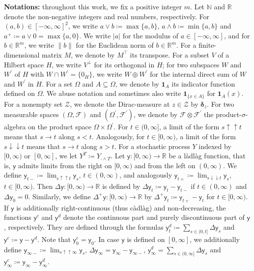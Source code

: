 \documentclass[10pt]{article} %
\newcommand\cF{\mathcal F}
\newcommand\cZ{\mathcal Z}
\def \N{\mathbb{N}}
\def \R{\mathbb{R}}
\newcommand{\1}{\mathbf{1}}
\begin{document}
\medskip
{\small\textbf{Notations:} {throughout this work, we fix a positive integer $m$. Let $\N$ and $\R$ denote the non-negative integers and real numbers, respectively. For $(a,b) \in [-\infty,\infty]^2$, we write $a \lor b \coloneqq \max\{a,b\}$, $a \land b \coloneqq \min\{a,b\}$ and $a^+ \coloneqq a \lor 0 = \max\{a,0\}$. We write $|a|$ for the modulus of $a \in [-\infty,\infty]$, and for $b \in \R^m$, we write $\|b\|$ for the Euclidean norm of $b \in \R^m$. For a finite-dimensional matrix $M$, we denote by $M^\top$ its transpose. For a subset $V$ of a Hilbert space $H$, we write $V^\perp$ for its orthogonal in $H$; for two subspaces $W$ and $W^\prime$ of $H$ with $W \cap W^\prime = \{0_H\}$, we write $W \oplus W^\prime$ for the internal direct sum of $W$ and $W^\prime$ in $H$.  For a set $\Omega$ and $A \subseteq \Omega$, we denote by $\mathbf{1}_A$ its indicator function defined on $\Omega$. We abuse notation and sometimes also write $\mathbf{1}_{\{x \in A\}}$ for $\mathbf{1}_{A}(x)$. For a nonempty set $\cZ$, we denote the Dirac-measure at $z \in \cZ$ by $\boldsymbol{\delta}_z$. For two measurable spaces $(\Omega,\cF)$ and $(\Omega^\prime,\cF^\prime)$, we denote by $\cF \otimes \cF^\prime$ the product-$\sigma$-algebra on the product space $\Omega \times \Omega^\prime$. For $t \in (0,\infty]$, a limit of the form $s \uparrow\uparrow t$ means that $s \rightarrow t$ along $s < t$. Analogously, for $t \in [0,\infty)$, a limit of the form $s \downarrow\downarrow t$ means that $s \rightarrow t$ along $s > t$. For a stochastic process $Y$ indexed by $[0,\infty)$ or $[0,\infty]$, we let $Y^T \coloneqq Y_{\cdot \land T}$.  Let $\mathsf{y} : [0,\infty) \rightarrow \R$ be a l\`adl\`ag function, that is, $\mathsf{y}$ admits limits from the right on $[0,\infty)$ and from the left on $(0,\infty)$. We define $\mathsf{y}_{t-} \coloneqq \lim_{s \uparrow\uparrow t} \mathsf{y}_s$, $t \in (0,\infty)$, and analogously $\mathsf{y}_{t+} \coloneqq \lim_{s \downarrow\downarrow t} \mathsf{y}_s$, $t \in [0,\infty)$. Then $\Delta \mathsf{y} : [0,\infty) \rightarrow \R$ is defined by $\Delta \mathsf{y}_t \coloneqq \mathsf{y}_t - \mathsf{y}_{t-}$ if $t \in (0,\infty)$ and $\Delta\mathsf{y}_0 = 0$. Similarly, we define $\Delta^+ \mathsf{y} : [0,\infty) \rightarrow \R$ by $\Delta^+ \mathsf{y}_t \coloneqq \mathsf{y}_{t+} - \mathsf{y}_t$ for $t \in [0,\infty)$. If $\mathsf{y}$ is additionally right-continuous (thus c\`adl\`ag) and non-decreasing, the functions $\mathsf{y}^c$ and $\mathsf{y}^d$ denote the continuous part and purely discontinuous part of $\mathsf{y}$, respectively. They are defined through the formulas $\mathsf{y}^d_t \coloneqq \sum_{s \in (0,t]} \Delta\mathsf{y}_s$ and $\mathsf{y}^c \coloneqq \mathsf{y} - \mathsf{y}^d$. Note that $\mathsf{y}^c_0 = \mathsf{y}_0$. In case $\mathsf{y}$ is defined on $[0,\infty]$, we additionally define $\mathsf{y}_{\infty-} \coloneqq \lim_{s \uparrow\uparrow \infty}\mathsf{y}_s$, $\Delta \mathsf{y}_\infty = \mathsf{y}_\infty - \mathsf{y}_{\infty-}$, $\mathsf{y}^d_{\infty} = \sum_{s \in (0,\infty]} \Delta \mathsf{y}_s$ and $\mathsf{y}^c_\infty \coloneqq \mathsf{y}_\infty - \mathsf{y}^d_\infty$.}}
\end{document}
